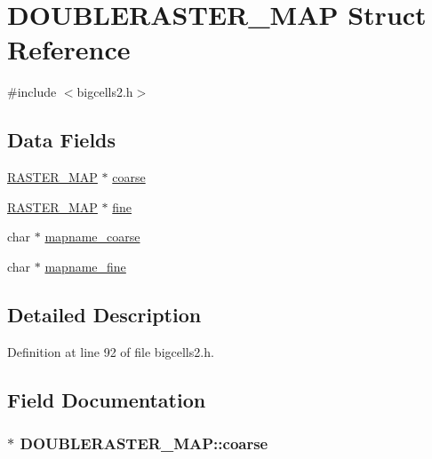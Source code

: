 \hypertarget{struct_d_o_u_b_l_e_r_a_s_t_e_r___m_a_p}{\section{D\-O\-U\-B\-L\-E\-R\-A\-S\-T\-E\-R\-\_\-\-M\-A\-P Struct Reference}
\label{struct_d_o_u_b_l_e_r_a_s_t_e_r___m_a_p}
}


{\ttfamily \#include $<$bigcells2.\-h$>$}

\subsection*{Data Fields}
\begin{DoxyCompactItemize}
\item 
\hyperlink{struct_r_a_s_t_e_r___m_a_p}{R\-A\-S\-T\-E\-R\-\_\-\-M\-A\-P} $\ast$ \hyperlink{struct_d_o_u_b_l_e_r_a_s_t_e_r___m_a_p_ae1c27578c5bbf7087e2bcd9b77d4f326}{coarse}
\item 
\hyperlink{struct_r_a_s_t_e_r___m_a_p}{R\-A\-S\-T\-E\-R\-\_\-\-M\-A\-P} $\ast$ \hyperlink{struct_d_o_u_b_l_e_r_a_s_t_e_r___m_a_p_a364a36b22a25bd279a05850e4397357f}{fine}
\item 
char $\ast$ \hyperlink{struct_d_o_u_b_l_e_r_a_s_t_e_r___m_a_p_a477e487196760961126756e6ddec6703}{mapname\-\_\-coarse}
\item 
char $\ast$ \hyperlink{struct_d_o_u_b_l_e_r_a_s_t_e_r___m_a_p_a9c99160b7734de521e28acf8607dc24c}{mapname\-\_\-fine}
\end{DoxyCompactItemize}


\subsection{Detailed Description}


Definition at line 92 of file bigcells2.\-h.



\subsection{Field Documentation}
\hypertarget{struct_d_o_u_b_l_e_r_a_s_t_e_r___m_a_p_ae1c27578c5bbf7087e2bcd9b77d4f326}{
\subsubsection[{coarse}]{$\ast$ D\-O\-U\-B\-L\-E\-R\-A\-S\-T\-E\-R\-\_\-\-M\-A\-P\-::coarse}}\label{struct_d_o_u_b_l_e_r_a_s_t_e_r___m_a_p_ae1c27578c5bbf7087e2bcd9b77d4f326}


